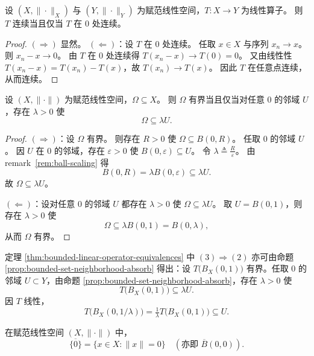 \documentclass[lang=cn,a4paper,newtx,section]{elegantbook}
\begin{document}
\begin{proposition}\label{prop:linear-continuous-iff-at-zero}
  设 $(X,\|\cdot\|_X)$ 与 $(Y,\|\cdot\|_Y)$ 为赋范线性空间，$T:X\to Y$ 为线性算子。
  则 $T$ 连续当且仅当 $T$ 在 $0$ 处连续。
\end{proposition}

\begin{proof}
  $(\Rightarrow)$ 显然。
  $(\Leftarrow)$：设 $T$ 在 $0$ 处连续。
  任取 $x\in X$ 与序列 $x_n\to x$。
  则 $x_n-x\to0$。
  由 $T$ 在 $0$ 处连续得 $T(x_n-x)\to T(0)=0$。
  又由线性性 $T(x_n-x)=T(x_n)-T(x)$，故 $T(x_n)\to T(x)$。
  因此 $T$ 在任意点连续，从而连续。
\end{proof}

\begin{proposition}\label{prop:bounded-set-neighborhood-absorb}
  设 $(X,\|\cdot\|)$ 为赋范线性空间，$\Omega\subseteq X$。
  则 $\Omega$ 有界当且仅当对任意 $0$ 的邻域 $U$，存在 $\lambda>0$ 使
  \[
    \Omega\subseteq \lambda U.
  \]
\end{proposition}

\begin{proof}
  $(\Rightarrow)$：设 $\Omega$ 有界。
  则存在 $R>0$ 使 $\Omega\subseteq B(0,R)$。
  任取 $0$ 的邻域 $U$。
  因 $U$ 在 $0$ 的邻域，存在 $\varepsilon>0$ 使 $B(0,\varepsilon)\subseteq U$。
  令 $\lambda\triangleq\frac{R}{\varepsilon}$。
  由 remark~\ref{rem:ball-scaling} 得
  \[
    B(0,R)=\lambda B(0,\varepsilon)\subseteq\lambda U.
  \]
  故 $\Omega\subseteq\lambda U$。

  $(\Leftarrow)$：设对任意 $0$ 的邻域 $U$ 都存在 $\lambda>0$ 使 $\Omega\subseteq\lambda U$。
  取 $U=B(0,1)$，则存在 $\lambda>0$ 使
  \[
    \Omega\subseteq\lambda B(0,1)=B(0,\lambda),
  \]
  从而 $\Omega$ 有界。
\end{proof}

\begin{remark}
  定理 \ref{thm:bounded-linear-operator-equivalences} 中 $(3)\Rightarrow(2)$ 亦可由命题 \ref{prop:bounded-set-neighborhood-absorb} 得出：设 $T\bigl(B_X(0,1)\bigr)$ 有界。任取 $0$ 的邻域 $U\subset Y$，由命题 \ref{prop:bounded-set-neighborhood-absorb}，存在 $\lambda>0$ 使
  \[
    T\bigl(B_X(0,1)\bigr)\subseteq \lambda U.
  \]
  因 $T$ 线性，
  \[
    T\bigl(B_X(0,1/\lambda)\bigr)=\tfrac{1}{\lambda}T\bigl(B_X(0,1)\bigr)\subseteq U.
  \]
\end{remark}

\begin{example}
  在赋范线性空间 $(X,\|\cdot\|)$ 中，
  \[
    \overline{\{0\}}=\{x\in X: \|x\|=0\}\quad(\text{亦即 }\overline{B}(0,0)).
  \]
\end{example}
\end{document}
